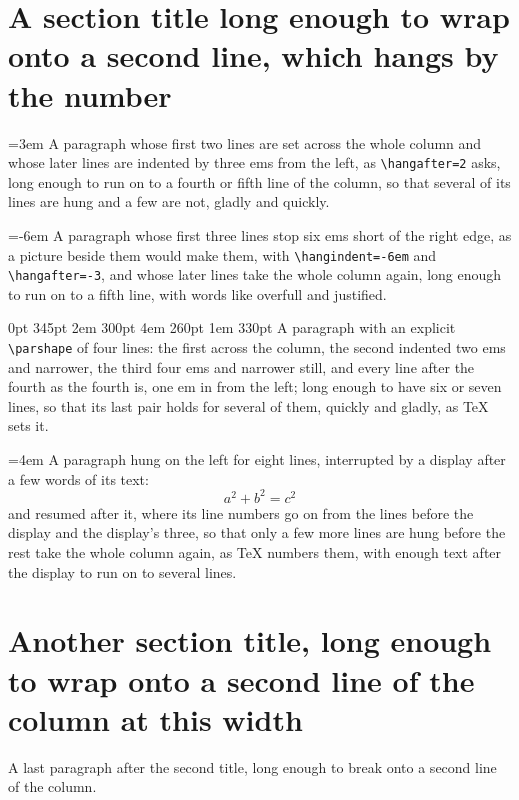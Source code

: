 \documentclass{article}
\begin{document}
\section{A section title long enough to wrap onto a second line, which hangs by the number}

\hangindent=3em 
A paragraph whose first two lines are set across the whole column and whose
later lines are indented by three ems from the left, as \verb|\hangafter=2|
asks, long enough to run on to a fourth or fifth line of the column, so that
several of its lines are hung and a few are not, gladly and quickly.

\hangindent=-6em 
A paragraph whose first three lines stop six ems short of the right edge, as
a picture beside them would make them, with \verb|\hangindent=-6em| and
\verb|\hangafter=-3|, and whose later lines take the whole column again, long
enough to run on to a fifth line, with words like overfull and justified.

 0pt 345pt 2em 300pt 4em 260pt 1em 330pt
A paragraph with an explicit \verb|\parshape| of four lines: the first across
the column, the second indented two ems and narrower, the third four ems and
narrower still, and every line after the fourth as the fourth is, one em in
from the left; long enough to have six or seven lines, so that its last
pair holds for several of them, quickly and gladly, as TeX sets it.

\hangindent=4em 
A paragraph hung on the left for eight lines, interrupted by a display after
a few words of its text:
\[ a^2 + b^2 = c^2 \]
and resumed after it, where its line numbers go on from the lines before the
display and the display's three, so that only a few more lines are hung
before the rest take the whole column again, as TeX numbers them, with
enough text after the display to run on to several lines.

\section{Another section title, long enough to wrap onto a second line of the column at this width}
A last paragraph after the second title, long enough to break onto a second
line of the column.
\end{document}
